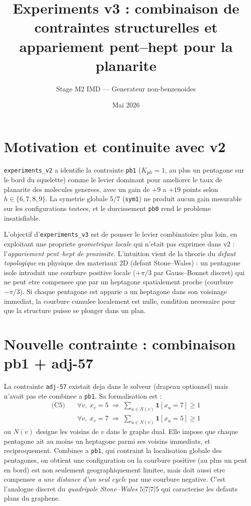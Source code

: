 \documentclass[11pt,a4paper]{article}
\title{Experiments v3 : combinaison de contraintes structurelles et appariement pent--hept pour la planarite}
\author{Stage M2 IMD --- Generateur non-benzenoides}
\date{Mai 2026}
\begin{document}
\maketitle

\section{Motivation et continuite avec v2}

\texttt{experiments\_v2} a identifie la contrainte \texttt{pb1}
($K_{\text{pb}} = 1$, au plus un pentagone sur le bord du squelette)
comme le levier dominant pour ameliorer le taux de planarite des
molecules generees, avec un gain de $+9$ a $+19$ points selon
$h \in \{6, 7, 8, 9\}$. La symetrie globale 5/7 (\texttt{sym1}) ne
produit aucun gain mesurable sur les configurations testees, et le
durcissement \texttt{pb0} rend le probleme insatisfiable.

L'objectif d'\texttt{experiments\_v3} est de pousser le levier
combinatoire plus loin, en exploitant une propriete \emph{geometrique
locale} qui n'etait pas exprimee dans v2 : l'\emph{appariement pent--hept
de proximite}. L'intuition vient de la theorie du \emph{defaut
topologique} en physique des materiaux 2D (defaut Stone--Wales) : un
pentagone isole introduit une courbure positive locale ($+\pi/3$ par
Gauss--Bonnet discret) qui ne peut etre compensee que par un heptagone
spatialement proche (courbure $-\pi/3$). Si chaque pentagone est apparie
a un heptagone dans son voisinage immediat, la courbure cumulee
localement est nulle, condition necessaire pour que la structure puisse
se plonger dans un plan.

\section{Nouvelle contrainte : combinaison pb1 + adj-57}

La contrainte \texttt{adj-57} existait deja dans le solveur (drapeau
optionnel) mais n'avait pas ete combinee a \texttt{pb1}. Sa
formalisation est :
\begin{align*}
  \text{(C5)} \quad & \forall v,\ x_v = 5 \;\Rightarrow\; \sum_{u \in N(v)} \mathbf{1}[x_u = 7] \ge 1 \\
                    & \forall v,\ x_v = 7 \;\Rightarrow\; \sum_{u \in N(v)} \mathbf{1}[x_u = 5] \ge 1
\end{align*}
ou $N(v)$ designe les voisins de $v$ dans le graphe dual. Elle impose
que chaque pentagone ait au moins un heptagone parmi ses voisins
immediats, et reciproquement. Combinee a \texttt{pb1}, qui contraint la
localisation globale des pentagones, on obtient une configuration ou la
courbure positive (au plus un pent en bord) est non seulement
geographiquement limitee, mais doit aussi etre compensee \emph{a une
distance d'un seul cycle} par une courbure negative. C'est l'analogue
discret du \emph{quadripole Stone--Wales} $5|7|7|5$ qui caracterise
les defauts plans du graphene.
\end{document}
